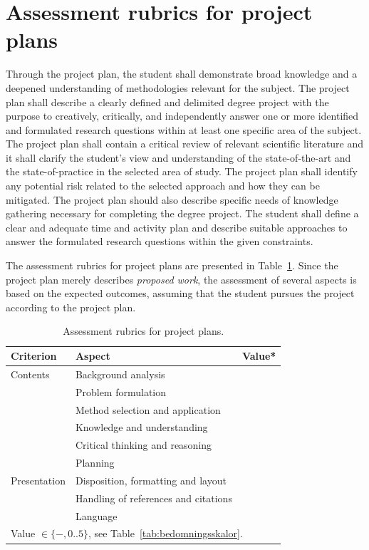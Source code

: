\documentclass[a4paper,12pt]{book}
\begin{document}
\section{Assessment rubrics for project plans}
%
Through the project plan, the student shall demonstrate broad knowledge
and a deepened understanding of methodologies relevant for the subject. The project
plan shall describe a clearly defined and delimited degree project with
the purpose to creatively, critically, and independently answer one or
more identified and formulated research questions within at least one
specific area of the subject. The project plan shall contain a critical
review of relevant scientific literature and it shall clarify the student's
view and understanding of the state-of-the-art and the state-of-practice in
the selected area
of study. The project plan shall identify any potential risk related to the
selected approach and how they can be mitigated. The project plan should also
describe specific needs of knowledge gathering necessary
for completing the degree project. The student shall define a clear and
adequate time and activity plan and describe suitable approaches to
answer the formulated research questions within the given constraints.

The assessment rubrics for project plans are presented in 
Table~\ref{tab:bedomning-projektplan}. Since the project
plan merely describes \emph{proposed work}, the assessment of several
aspects is based on the expected outcomes, assuming that the student pursues
the project according to the project plan. 
%
\begin{table}[h]
\centering
\caption{Assessment rubrics for project plans.}
\label{tab:bedomning-projektplan}
\begin{tabular}{|l|l|l|}
\hline
Criterion      & Aspect                                     & Value* \\\hline
Contents       & Background analysis                        &       \\\hline
               & Problem formulation                        &       \\\hline
               & Method selection and application           &       \\\hline
               & Knowledge and understanding                &       \\\hline
               & Critical thinking and reasoning            &       \\\hline
               & Planning                                   &       \\\hline
Presentation   & Disposition, formatting and layout         &       \\\hline
               & Handling of references and citations       &       \\\hline
               & Language                                   &       \\
\hline
\multicolumn{3}{l}{\footnotesize{Value $\in \{-,0..5\}$, see Table~\ref{tab:bedomningsskalor}}.}
\end{tabular}
\end{table}
\end{document}

